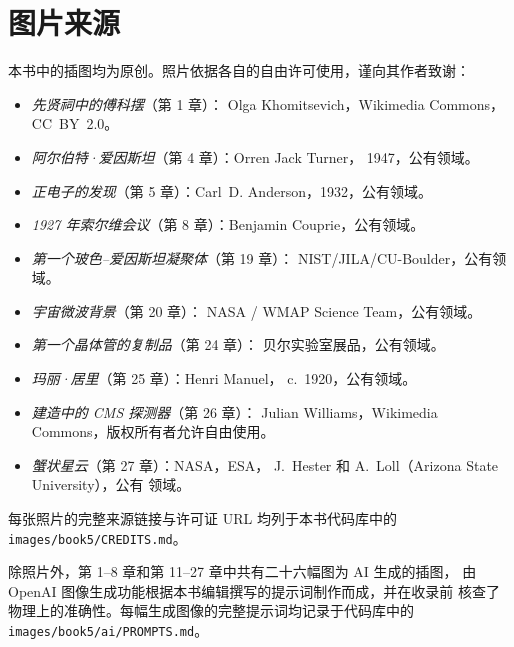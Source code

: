 \chapter*{图片来源}

本书中的插图均为原创。照片依据各自的自由许可使用，谨向其作者致谢：

\begin{itemize}
  \item \emph{先贤祠中的傅科摆}（第 1 章）：
        Olga Khomitsevich，Wikimedia Commons，CC~BY~2.0。
  \item \emph{阿尔伯特·爱因斯坦}（第 4 章）：Orren Jack Turner，
        1947，公有领域。
  \item \emph{正电子的发现}（第 5 章）：Carl~D.
        Anderson，1932，公有领域。
  \item \emph{1927 年索尔维会议}（第 8 章）：Benjamin
        Couprie，公有领域。
  \item \emph{第一个玻色–爱因斯坦凝聚体}（第 19 章）：
        NIST/JILA/CU-Boulder，公有领域。
  \item \emph{宇宙微波背景}（第 20 章）：
        NASA / WMAP Science Team，公有领域。
  \item \emph{第一个晶体管的复制品}（第 24 章）：
        贝尔实验室展品，公有领域。
  \item \emph{玛丽·居里}（第 25 章）：Henri Manuel，
        c.~1920，公有领域。
  \item \emph{建造中的 CMS 探测器}（第 26 章）：
        Julian Williams，Wikimedia Commons，版权所有者允许自由使用。
  \item \emph{蟹状星云}（第 27 章）：NASA，ESA，
        J.~Hester 和 A.~Loll（Arizona State University），公有
        领域。
\end{itemize}

每张照片的完整来源链接与许可证 URL 均列于本书代码库中的
\texttt{images/book5/CREDITS.md}。

\bigskip
除照片外，第 1--8 章和第 11--27 章中共有二十六幅图为 AI 生成的插图，
由 OpenAI 图像生成功能根据本书编辑撰写的提示词制作而成，并在收录前
核查了物理上的准确性。每幅生成图像的完整提示词均记录于代码库中的
\texttt{images/book5/ai/PROMPTS.md}。
\clearpage
